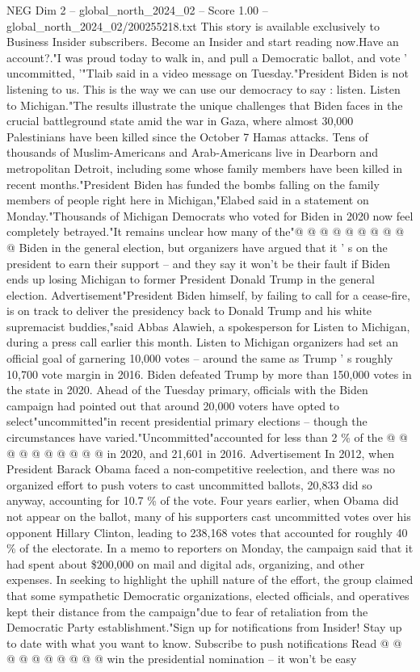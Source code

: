 \begin{textsample}{NEG Dim 2 – global\_north\_2024\_02 – Score 1.00 – global\_north\_2024\_02/200255218.txt}  \label{ex:f2_neg_301}
This story is available exclusively to Business Insider subscribers.
Become an Insider and start reading now.Have an account?."I was proud today to walk in, and pull a Democratic ballot, and vote ' uncommitted, '"Tlaib said in a video message on Tuesday."President Biden is not listening to us.
This is the way we can use our democracy to say : listen.
Listen to Michigan."The results illustrate the unique challenges that Biden faces in the crucial battleground state amid the war in Gaza, where almost 30,000 Palestinians have been killed since the October 7 Hamas attacks.
Tens of thousands of Muslim-Americans and Arab-Americans live in Dearborn and metropolitan Detroit, including some whose family members have been killed in recent months."President Biden has funded the bombs falling on the family members of people right here in Michigan,"Elabed said in a statement on Monday."Thousands of Michigan Democrats who voted for Biden in 2020 now feel completely betrayed."It remains unclear how many of the"@ @ @ @ @ @ @ @ @ @ Biden in the general election, but organizers have argued that it ' s on the president to earn their support -- and they say it won't be their fault if Biden ends up losing Michigan to former President Donald Trump in the general election.
Advertisement"President Biden himself, by failing to call for a cease-fire, is on track to deliver the presidency back to Donald Trump and his white supremacist buddies,"said Abbas Alawieh, a spokesperson for Listen to Michigan, during a press call earlier this month.
Listen to Michigan organizers had set an official goal of garnering 10,000 votes -- around the same as Trump ' s roughly 10,700 vote margin in 2016.
Biden defeated Trump by more than 150,000 votes in the state in 2020.
Ahead of the Tuesday primary, officials with the Biden campaign had pointed out that around 20,000 voters have opted to select"uncommitted"in recent presidential primary elections -- though the circumstances have varied."Uncommitted"accounted for less than 2 \% of the @ @ @ @ @ @ @ @ @ @ in 2020, and 21,601 in 2016.
Advertisement In 2012, when President Barack Obama faced a non-competitive reelection, and there was no organized effort to push voters to cast uncommitted ballots, 20,833 did so anyway, accounting for 10.7 \% of the vote.
Four years earlier, when Obama did not appear on the ballot, many of his supporters cast uncommitted votes over his opponent Hillary Clinton, leading to 238,168 votes that accounted for roughly 40 \% of the electorate.
In a memo to reporters on Monday, the campaign said that it had spent about \$200,000 on mail and digital ads, organizing, and other expenses.
In seeking to highlight the uphill nature of the effort, the group claimed that some sympathetic Democratic organizations, elected officials, and operatives kept their distance from the campaign"due to fear of retaliation from the Democratic Party establishment."Sign up for notifications from Insider!
Stay up to date with what you want to know.
Subscribe to push notifications Read @ @ @ @ @ @ @ @ @ @ win the presidential nomination -- it won't be easy

\end{textsample}
